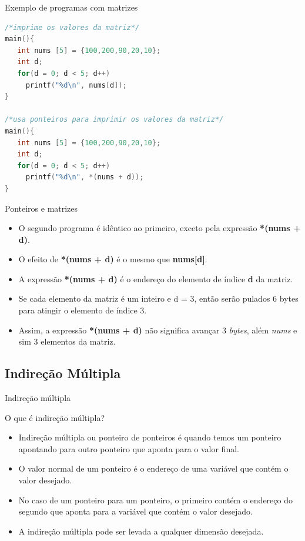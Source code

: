 \begin{frame}{Exemplo de programas com matrizes}
\begin{lstlisting}[language=C]
/*imprime os valores da matriz*/
main(){
   int nums [5] = {100,200,90,20,10};
   int d;
   for(d = 0; d < 5; d++)
     printf("%d\n", nums[d]);
}

/*usa ponteiros para imprimir os valores da matriz*/
main(){
   int nums [5] = {100,200,90,20,10};
   int d;
   for(d = 0; d < 5; d++)
     printf("%d\n", *(nums + d));
}
\end{lstlisting}
\end{frame}

\begin{frame}{Ponteiros e matrizes}  
  \begin{itemize}[<+->]
    \item O segundo programa é idêntico ao primeiro, exceto pela expressão \textbf{*(nums + d)}.
    \item \alert{O efeito de \textbf{*(nums + d)} é o mesmo que \textbf{nums[d]}}.
    \item A expressão \textbf{*(nums + d)} é o endereço do elemento de índice \textbf{d} da matriz.
    \item Se cada elemento da matriz é um inteiro e d = 3, então serão pulados 6 bytes para atingir o elemento de índice 3.
    \item Assim, a expressão \textbf{*(nums + d)} não significa avançar 3 \textit{bytes}, além \textit{nums} e sim 3 elementos da matriz.
  \end{itemize}
\end{frame}

\subsection{Indireção Múltipla}
\begin{frame}[c]{Indireção múltipla}
\begin{block}{O que é indireção múltipla?}
  \begin{itemize}[<+->]
    \item Indireção múltipla ou ponteiro de ponteiros é quando temos um ponteiro apontando para outro ponteiro que aponta para o valor final.
    \item O valor normal de um ponteiro é o endereço de uma variável que contém o valor desejado.
    \item No caso de um ponteiro para um ponteiro, o primeiro contém o endereço do segundo que aponta para a variável que contém o valor desejado.
    \item A indireção múltipla pode ser levada a qualquer dimensão desejada. 
  \end{itemize}
\end{block}    
\end{frame}

